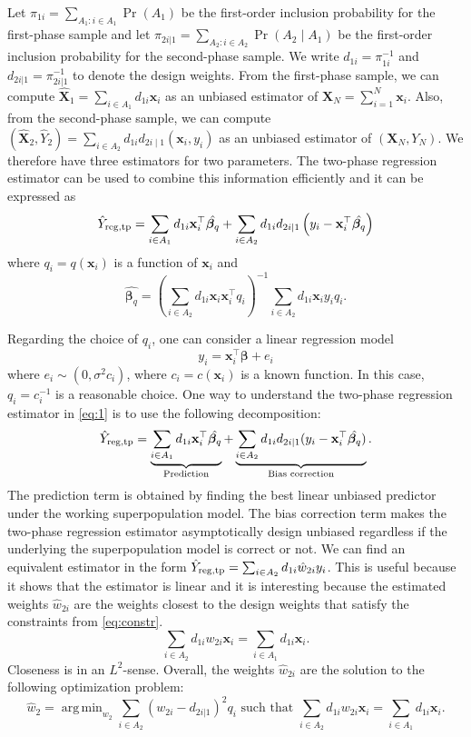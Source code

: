 \documentclass[12pt]{article}
\DeclareMathOperator*{\argmin}{arg\,min}
\newcommand{\bx}{\mathbf{x}}
\renewcommand{\bf}[1]{\mathbf{#1}}
\begin{document}
Let $\pi_{1i} = \sum_{A_1: i \in A_1} \Pr(A_1)$ be the first-order inclusion
probability for the first-phase sample and let $\pi_{2i | 1} = \sum_{A_2: i \in
A_2} \Pr(A_2 \mid A_1)$ be the first-order inclusion probability for the
second-phase sample. We write $d_{1i} = \pi_{1i}^{-1}$ and $d_{2i|1} =
\pi_{2i|1}^{-1}$ to denote the design weights.
From the first-phase sample, we can compute
$\widehat{\mathbf{X}}_1 = \sum_{i \in A_1} d_{1i}\bx_i$ as an unbiased
estimator of $\mathbf{X}_N = \sum_{i=1}^N  \bx_i$. Also, from the second-phase
sample, we can compute $\left( \widehat{\mathbf{X}}_2 , \hat{Y}_2 \right) =
\sum_{i \in A_2} d_{1i} d_{2i \mid 1} \left( \bx_i, y_i\right)$ as
an unbiased estimator of $(\mathbf{X}_N, Y_N)$.
We therefore have three estimators for
two parameters. The two-phase regression estimator can be  used to combine this
information efficiently and it can be expressed as  
\begin{equation} \label{eq:1}
\hat Y_{\rm reg, tp} 
= \sum_{i \in A_1} d_{1i} \bf x_i^\top  \hat{\bm \beta_q} + 
\sum_{i \in A_2} d_{1i} d_{2i|1} \left(y_i - \bf x_i^\top  \hat{\bm \beta_q}\right)
\end{equation} 
where $q_i = q(\bf x_i)$  is a function of $\bf x_i$ and  
$$
\hat{\bm \beta_q} = \left(\sum_{i \in A_2} 
d_{1i} \bf x_i \bf x_i^\top q_i \right)^{-1} 
 \sum_{i \in A_2} d_{1i}\bf{x}_i y_i q_i.
$$ 

Regarding the choice of $q_i$, one can consider a linear regression model 
\begin{equation}
y_i = \bx_i^\top \bm \beta + e_i 
\label{regression}
\end{equation}
where $e_i \sim \left(0, \sigma^2 c_i \right)$, where $c_i=c( \bx_i)$ is a known
function. In this case,  $q_i = c_i^{-1}$ is a reasonable choice. 
One way to understand the two-phase regression estimator in \eqref{eq:1}
is to use the following decomposition: 
$$ 
\hat Y_{\rm reg, tp} 
= \underbrace{\sum_{i \in A_1} d_{1i}\bf x_i^\top \hat{\bm \beta_q}}_{
  \text{ Prediction  }} + \underbrace{\sum_{i \in A_2}
d_{1i} d_{2i|1}(y_i - \bf x_i^\top \hat{\bm \beta_q})}_{
\text{Bias correction}}.
$$
The prediction term is obtained by finding the best linear unbiased predictor
under the working superpopulation model. The bias correction term 
makes the two-phase regression estimator asymptotically design unbiased
regardless if the underlying the superpopulation model is correct or not.
We can find an equivalent estimator in the form $\hat Y_{\rm reg, tp} =
\sum_{i \in A_2} d_{1i} \hat w_{2i} y_i$. This is useful because it shows that
the estimator is linear and it is interesting because the estimated weights
$\hat w_{2i}$ are the weights closest to the design weights that satisfy the
constraints from \eqref{eq:constr}.
\begin{equation}\label{eq:constr}
\sum_{i \in A_2} d_{1i} w_{2i} \bf{x}_i 
= \sum_{i \in A_1} d_{1i} \bf{x}_i.
\end{equation}
Closeness is in an $L^2$-sense. Overall, the weights $\hat w_{2i}$ are the
solution to the following optimization problem:
$$
\hat w_{2} = \argmin_{w_2} \sum_{i \in A_2} (w_{2i} - d_{2i|1})^2 q_i
\text{ such that } \sum_{i \in A_2} d_{1i} w_{2i} \bf{x}_i 
= \sum_{i \in A_1} d_{1i} \bf{x}_i.
$$
\end{document}
